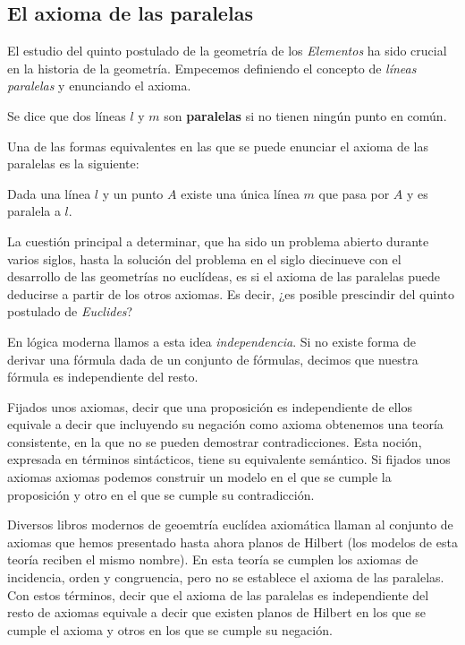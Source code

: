 \subsection{El axioma de las paralelas}

El estudio del quinto postulado de la geometría de los \textit{Elementos} ha
sido crucial en la historia de la geometría. Empecemos definiendo el
concepto de \textit{líneas paralelas} y enunciando el axioma.

\begin{defin*}
	Se dice que dos líneas $l$ y $m$ son \textbf{paralelas} si no tienen ningún
	punto en común.
\end{defin*}

Una de las formas equivalentes en las que se puede enunciar el axioma de las
paralelas es la siguiente:


\begin{axb}[P]\label{ax:P}
	Dada una línea $l$ y un punto $A$ existe una única línea $m$ que pasa por
	$A$ y es paralela a $l$.
\end{axb}


La cuestión principal a determinar, que ha sido un problema abierto durante
varios siglos, hasta la solución del problema en el siglo diecinueve con el
desarrollo de las geometrías no euclídeas, es si el axioma de las paralelas
puede deducirse a partir de los otros axiomas. Es decir, ¿es posible prescindir
del quinto postulado de \textit{Euclides}?

En lógica moderna llamos a esta idea \textit{independencia}. Si no existe forma
de derivar una fórmula dada de un conjunto de fórmulas, decimos que nuestra
fórmula es independiente del resto.

Fijados unos axiomas, decir que una proposición es independiente de ellos
equivale a decir que incluyendo su negación como axioma
obtenemos una teoría consistente, en la que no se pueden demostrar
contradicciones. Esta noción, expresada en términos sintácticos, tiene su
equivalente semántico. Si fijados unos axiomas axiomas podemos construir un
modelo en el que se cumple la proposición y otro en el que se cumple su
contradicción.

Diversos libros modernos de geoemtría euclídea axiomática llaman al conjunto de
axiomas que hemos presentado hasta ahora planos de Hilbert (los modelos
de esta teoría reciben el mismo nombre). En esta teoría se cumplen los axiomas
de incidencia, orden y congruencia, pero no se establece el axioma de las
paralelas. Con estos términos, decir que el axioma de las paralelas es
independiente del resto de axiomas equivale a decir que existen planos de
Hilbert en los que se cumple el axioma y otros en los que se cumple su negación.


